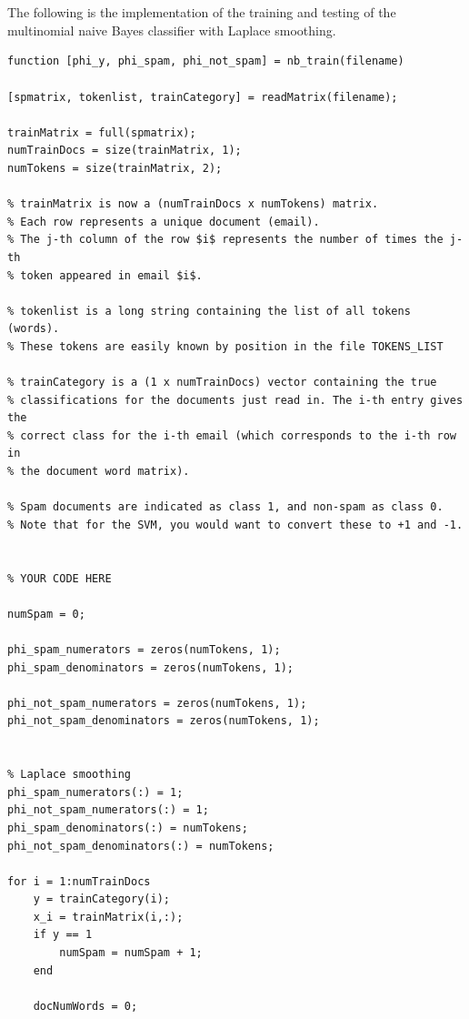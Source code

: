 \documentclass[11pt,a4paper,titlepage]{article}
\begin{document}
\section{}{
\subsection{}{
\quad The following is the implementation of the training and testing of the multinomial naive Bayes classifier with Laplace smoothing.
\begin{verbatim}
function [phi_y, phi_spam, phi_not_spam] = nb_train(filename)

[spmatrix, tokenlist, trainCategory] = readMatrix(filename);

trainMatrix = full(spmatrix);
numTrainDocs = size(trainMatrix, 1);
numTokens = size(trainMatrix, 2);

% trainMatrix is now a (numTrainDocs x numTokens) matrix.
% Each row represents a unique document (email).
% The j-th column of the row $i$ represents the number of times the j-th
% token appeared in email $i$. 

% tokenlist is a long string containing the list of all tokens (words).
% These tokens are easily known by position in the file TOKENS_LIST

% trainCategory is a (1 x numTrainDocs) vector containing the true 
% classifications for the documents just read in. The i-th entry gives the 
% correct class for the i-th email (which corresponds to the i-th row in 
% the document word matrix).

% Spam documents are indicated as class 1, and non-spam as class 0.
% Note that for the SVM, you would want to convert these to +1 and -1.


% YOUR CODE HERE

numSpam = 0;

phi_spam_numerators = zeros(numTokens, 1);
phi_spam_denominators = zeros(numTokens, 1);

phi_not_spam_numerators = zeros(numTokens, 1);
phi_not_spam_denominators = zeros(numTokens, 1);


% Laplace smoothing
phi_spam_numerators(:) = 1;
phi_not_spam_numerators(:) = 1;
phi_spam_denominators(:) = numTokens;
phi_not_spam_denominators(:) = numTokens;

for i = 1:numTrainDocs
    y = trainCategory(i);
    x_i = trainMatrix(i,:);
    if y == 1
        numSpam = numSpam + 1;
    end
    
    docNumWords = 0;
    

\end{verbatim}}}
\end{document}
